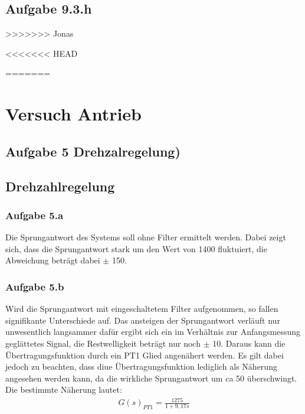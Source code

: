 \documentclass[10pt]{scrartcl}
\begin{document}
\subsection{Aufgabe 9.3.h}
>>>>>>> Jonas

<<<<<<< HEAD

=======
\section{Versuch Antrieb}
\subsection{Aufgabe 5 Drehzalregelung)}
\subsection{Drehzahlregelung}
\subsubsection{Aufgabe 5.a}
Die Sprungantwort des Systems soll ohne Filter ermittelt werden. Dabei zeigt sich, dass die Sprungantwort stark um den Wert von 1400 fluktuiert, die Abweichung beträgt dabei $\pm$ 150.
\subsubsection{Aufgabe 5.b}
Wird die Sprungantwort mit eingeschaltetem Filter aufgenommen, so fallen signifikante Unterschiede auf. Das ansteigen der Sprungantwort verläuft nur unwesentlich langsammer dafür ergibt sich ein im Verhältnis zur Anfangsmessung geglättetes Signal, die Restwelligkeit  beträgt nur noch $\pm$ 10. Daraus kann die Übertragungsfunktion durch ein PT1 Glied angenähert werden. Es gilt dabei jedoch zu beachten, dass diue Übertragungsfunktion lediglich als Näherung angesehen werden kann, da die wirkliche Sprungantwort um ca 50 überschwingt. Die bestimmte Näherung lautet: 
\begin{align}
   G(s)_{PT1}=\frac{1275}{1+9,17s}
\end{align}
\end{document}
